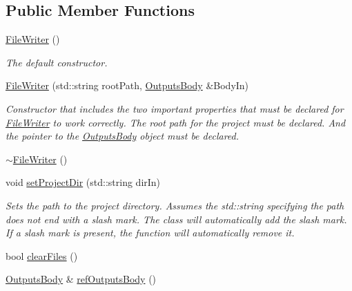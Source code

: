 \subsection*{Public Member Functions}
\begin{DoxyCompactItemize}
\item 
\hypertarget{classosea_1_1ofreq_1_1_file_writer_aa6b362f5b306dd3409af81a463e97f40}{\hyperlink{classosea_1_1ofreq_1_1_file_writer_aa6b362f5b306dd3409af81a463e97f40}{File\-Writer} ()}\label{classosea_1_1ofreq_1_1_file_writer_aa6b362f5b306dd3409af81a463e97f40}

\begin{DoxyCompactList}\small\item\em The default constructor. \end{DoxyCompactList}\item 
\hyperlink{classosea_1_1ofreq_1_1_file_writer_aa99ec25b5ed26ad1542eb94104fef1ce}{File\-Writer} (std\-::string root\-Path, \hyperlink{classosea_1_1ofreq_1_1_outputs_body}{Outputs\-Body} \&Body\-In)
\begin{DoxyCompactList}\small\item\em Constructor that includes the two important properties that must be declared for \hyperlink{classosea_1_1ofreq_1_1_file_writer}{File\-Writer} to work correctly. The root path for the project must be declared. And the pointer to the \hyperlink{classosea_1_1ofreq_1_1_outputs_body}{Outputs\-Body} object must be declared. \end{DoxyCompactList}\item 
\hyperlink{classosea_1_1ofreq_1_1_file_writer_ae5490307dcaf9237f4c1b8b8df433e03}{$\sim$\-File\-Writer} ()
\item 
void \hyperlink{classosea_1_1ofreq_1_1_file_writer_aa1dbf0e1a54a78fb62d799187752b002}{set\-Project\-Dir} (std\-::string dir\-In)
\begin{DoxyCompactList}\small\item\em Sets the path to the project directory. Assumes the std\-::string specifying the path does not end with a slash mark. The class will automatically add the slash mark. If a slash mark is present, the function will automatically remove it. \end{DoxyCompactList}\item 
bool \hyperlink{classosea_1_1ofreq_1_1_file_writer_a74a40c3c47b4d12582a2aa44c38d9d07}{clear\-Files} ()
\item 
\hyperlink{classosea_1_1ofreq_1_1_outputs_body}{Outputs\-Body} \& \hyperlink{classosea_1_1ofreq_1_1_file_writer_a77da1b41e1332209f39243fcca4d1287}{ref\-Outputs\-Body} ()

\end{DoxyCompactItemize}
